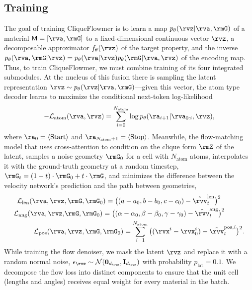 \documentclass{article}
\theoremstyle{plain}
\theoremstyle{definition}
\theoremstyle{remark}
\begin{document}
\subsection{Training}
\vspace{-5pt}
The goal of training CliqueFlowmer is to learn a map $p_{\theta}(\rvz|\rva, \rmG)$ of a material $\mathsf{M}=[\rva, \rmG]$ to a fixed-dimensional continuous vector $\rvz$, a decomposable approximator $f_{\theta}(\rvz)$ of the target property, and the inverse $p_{\theta}(\rva, \rmG|\rvz)=p_{\theta}(\rva|\rvz)p_{\theta}(\rmG|\rva, \rvz)$ of the encoding map.
Thus, to train CliqueFlowmer, we must combine training of its four integrated submodules.
At the nucleus of this fusion there is sampling the latent representation $\rvz\sim p_{\theta}(\rvz|\rva, \rmG)$---given this vector, the atom type decoder learns to maximize the conditional next-token log-likelihood 
\begin{align}
    -\mathcal{L}_{\text{atom}}(\rva, \rvz) = \sum_{i=0}^{N_{\text{atom}}}\log p_{\theta}(\ra_{i+1}|\rva_{0:i}, \rvz), \nonumber
    \vspace{-30pt}
\end{align}
where $\ra_{0}=\langle\operatorname{Start}\rangle$ and $\ra_{N_{\text{atom}}+1}=\langle\operatorname{Stop}\rangle$.
Meanwhile, the flow-matching model that uses cross-attention to condition on the clique form $\rmZ$ of the latent, samples a noise geometry $\rmG_{0}$ for a cell with $N_{\text{atom}}$ atoms, interpolates it with the ground-truth geometry at a random timestep, $\rmG_t=(1-t)\cdot\rmG_0 + t\cdot \rmG$, and minimizes the difference between the velocity network's prediction and the path between geometries,
\begin{align}
    \mathcal{L}_{\text{len}}(\rva, \rvz&, \rmG, \rmG_{0}) = \big( (a-a_0, b-b_0, c-c_0) - \hat{\rvv}^{\text{len}}_t\big)^2 \nonumber\\
    \mathcal{L}_{\text{ang}}(\rva, \rvz,& \rmG, \rmG_{0})= \big((\alpha-\alpha_0, \beta-\beta_0, \gamma-\gamma_0) - \hat{\rvv}^{\text{ang}}_t\big)^2 \nonumber \\
    \mathcal{L}_{\text{pos}}(\rva&, \rvz, \rmG, \rmG_{0}) = \sum_{i=1}^{N_{\text{atom}}}\big((\rvx^i - \rvx^i_{0}) - \hat{\rvv}^{\text{pos}, i}_t\big)^2. \nonumber
\end{align}
While training the flow denoiser, we mask the latent $\rvz$ and replace it with a random normal noise, $\epsilon_{\rvz}\sim \mathcal{N}(\mathbf{0}_{d_{\rvz}}, \mathbf{I}_{d_{\rvz}})$ with probability $p_{\text{lat}}=0.1$.
We decompose the flow loss into distinct components to ensure that the unit cell (lengths and angles) receives equal weight for every material in the batch. 
\end{document}
